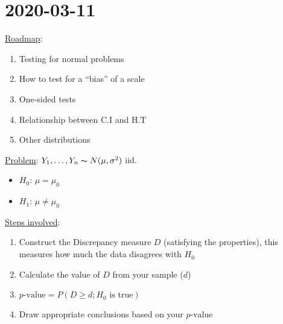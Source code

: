 \section{2020-03-11}
\underline{Roadmap}:
\begin{enumerate}[label=(\roman*)]
    \item Testing for normal problems
    \item How to test for a ``bias'' of a scale
    \item One-sided tests
    \item Relationship between C.I and H.T
    \item Other distributions
\end{enumerate}
\underline{Problem}: $ Y_1,\ldots ,Y_n \thicksim N(\mu,\sigma^2) $ iid.
\begin{itemize}
    \item $ H_0 $: $ \mu=\mu_0 $
    \item $ H_1 $: $ \mu\neq \mu_0 $
\end{itemize}
\underline{Steps involved}:
\begin{enumerate}[label=(\roman*)]
    \item Construct the Discrepancy measure $ D $ (satisfying the properties), this
          measures how much the data disagrees with $ H_0 $
    \item Calculate the value of $ D $ from your sample ($ d $)
    \item $ p\text{-value}=P(D\geqslant d; H_0\text{ is true}) $
    \item Draw appropriate conclusions based on your $ p\text{-value} $
\end{enumerate}
